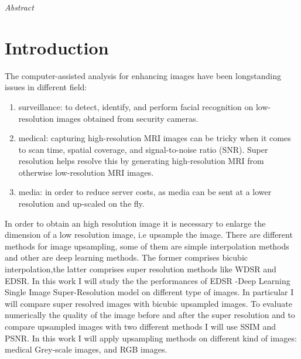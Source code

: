 \documentclass[a4paper, 10pt]{book}
\begin{document}


\date{}

\newpage

\vspace*{125px}
\LARGE\textit{Abstract}
\normalsize
\vspace{2mm}



\newpage
\normalsize 


\tableofcontents

\newpage

\chapter{Introduction}
The computer-assisted analysis for enhancing images have been longstanding issues in different field:
\begin{enumerate} 

\item surveillance: to detect, identify, and perform facial recognition on low-resolution images obtained from security cameras.
\item medical: capturing high-resolution MRI images can be tricky when it comes to scan time, spatial coverage, and signal-to-noise ratio (SNR). Super resolution helps resolve this by generating high-resolution MRI from otherwise low-resolution MRI images.
\item media: in order to reduce server costs, as media can be sent at a lower resolution and up-scaled on the fly.
\end{enumerate}
In order to obtain an high resolution image it is necessary to enlarge the dimension of a  low resolution image, i.e upsample the image. There are different methods for image upsampling, some of them are simple interpolation methods and other are deep learning methods.
The former comprises bicubic interpolation,the latter comprises super resolution methods like WDSR and EDSR.
In this work I will study the the performances of EDSR -Deep
Learning Single Image Super-Resolution model on different type of images.
In particular I will compare super resolved images with bicubic upsampled images.
To evaluate numerically the quality of the image before and after the super resolution and to compare upsampled images  with two different methods I will use SSIM and PSNR.
In this work I will apply upsampling methods on different kind of images: medical Grey-scale images, and RGB images.
\end{document}
